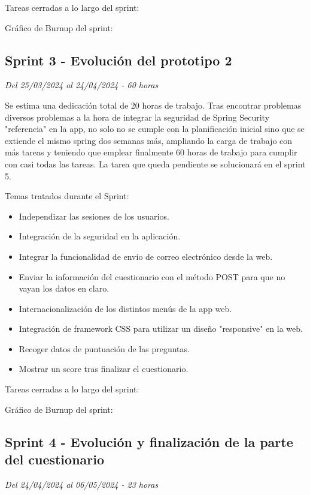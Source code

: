 Tareas cerradas a lo largo del sprint:

Gráfico de Burnup del sprint:


\subsection{Sprint 3 - Evolución del prototipo 2}
\textit{Del 25/03/2024 al 24/04/2024 - 60 horas}

Se estima una dedicación total de 20 horas de trabajo.
Tras encontrar problemas diversos problemas a la hora de integrar la seguridad de Spring Security "referencia" en la app, no solo no se cumple con la planificación inicial sino que se extiende el mismo spring dos semanas más, ampliando la carga de trabajo con más tareas y teniendo que emplear finalmente 60 horas de trabajo para cumplir con casi todas las tareas.
La tarea que queda pendiente se solucionará en el sprint 5.

Temas tratados durante el Sprint:
\begin{itemize}
	\item
	Independizar las sesiones de los usuarios.
	\item
	Integración de la seguridad en la aplicación.
	\item
	Integrar la funcionalidad de envío de correo electrónico desde la web.
	\item
	Enviar la información del cuestionario con el método POST para que no vayan los datos en claro.
	\item
	Internacionalización de los distintos menús de la app web.
	\item
	Integración de framework CSS para utilizar un diseño "responsive" en la web.
	\item
	Recoger datos de puntuación de las preguntas.
	\item
	Mostrar un score tras finalizar el cuestionario.
\end{itemize}

Tareas cerradas a lo largo del sprint:

Gráfico de Burnup del sprint:


\subsection{Sprint 4 - Evolución y finalización de la parte del cuestionario}
\textit{Del 24/04/2024 al 06/05/2024 - 23 horas}

